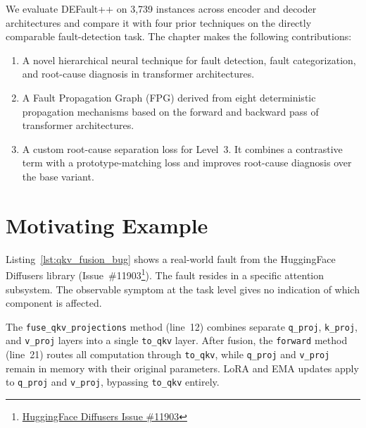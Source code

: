 We evaluate DEFault++ on 3{,}739 instances across encoder and decoder architectures and compare it with four prior techniques on the directly comparable fault-detection task. The chapter makes the following contributions:

\begin{enumerate}[label=(\alph*)]
\item A novel hierarchical neural technique for fault detection, fault categorization, and root-cause diagnosis in transformer architectures.

\item A Fault Propagation Graph (FPG) derived from eight deterministic propagation mechanisms based on the forward and backward pass of transformer architectures. 

\item A custom root-cause separation loss for Level~3. It combines a contrastive term with a prototype-matching loss and improves root-cause diagnosis over the base variant.
\end{enumerate}

\section{Motivating Example}
\label{sec:defaultpp_motivation}

Listing~\ref{lst:qkv_fusion_bug} shows a real-world fault from the HuggingFace Diffusers library (Issue~\#11903\footnote{\href{https://github.com/huggingface/diffusers/issues/11903}{HuggingFace Diffusers Issue \#11903}}). The fault resides in a specific attention subsystem. The observable symptom at the task level gives no indication of which component is affected.

\begin{listing}[!htbp]
\caption{Faulty QKV projection fusion from HuggingFace Diffusers Issue \#11903 (simplified).}
\label{lst:qkv_fusion_bug}
\end{listing}

The \texttt{fuse\_qkv\_projections} method (line~12) combines separate \texttt{q\_proj}, \texttt{k\_proj}, and \texttt{v\_proj} layers into a single \texttt{to\_qkv} layer. After fusion, the \texttt{forward} method (line~21) routes all computation through \texttt{to\_qkv}, while \texttt{q\_proj} and \texttt{v\_proj} remain in memory with their original parameters. LoRA and EMA updates apply to \texttt{q\_proj} and \texttt{v\_proj}, bypassing \texttt{to\_qkv} entirely.

